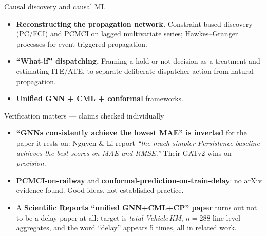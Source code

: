 \documentclass[aspectratio=169,10pt]{beamer}
\begin{document}
\begin{frame}{Causal discovery and causal ML}
  \begin{itemize}
    \item \textbf{Reconstructing the propagation network.} Constraint-based discovery
      (PC/FCI) and PCMCI on lagged multivariate series; Hawkes--Granger processes for
      event-triggered propagation.
    \item \textbf{``What-if'' dispatching.} Framing a hold-or-not decision as a treatment
      and estimating ITE/ATE, to separate deliberate dispatcher action from natural
      propagation.
    \item \textbf{Unified GNN + CML + conformal} frameworks.
  \end{itemize}

  \vspace{0.8em}
  \begin{alertblock}{\small Verification matters --- claims checked individually}
    \small
    \begin{itemize}\small
      \item \textbf{``GNNs consistently achieve the lowest MAE'' is inverted} for the paper
        it rests on: Nguyen \& Li report \emph{``the much simpler Persistence baseline
        achieves the best scores on MAE and RMSE.''} Their GATv2 wins on \emph{precision}.
      \item \textbf{PCMCI-on-railway} and \textbf{conformal-prediction-on-train-delay}:
        no arXiv evidence found. Good ideas, not established practice.
      \item A \textbf{Scientific Reports ``unified GNN+CML+CP'' paper} turns out not to be a
        delay paper at all: target is \emph{total Vehicle\,KM}, $n=288$ line-level
        aggregates, and the word ``delay'' appears 5 times, all in related work.
    \end{itemize}
  \end{alertblock}
\end{frame}
\end{document}
